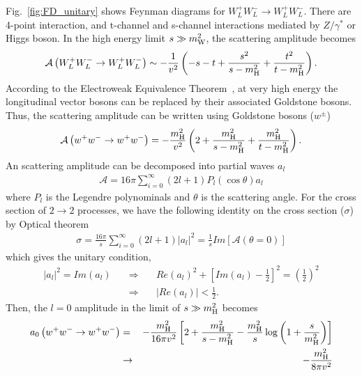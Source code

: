 Fig.~\ref{fig:FD_unitary} shows Feynman diagrams for $W_L^+W_L^- \to W_L^+W_L^-$. 
There are 4-point interaction, and t-channel and s-channel interactions mediated 
by $Z/\gamma^*$ or Higgs boson.
In the high energy limit $s \gg m_{\mathrm{W}}^2$, the scattering amplitude becomes \cite{Djouadi20081} 
\begin{eqnarray} 
\label{eq:WWscat}
\mathcal{A}\left( W_L^+W_L^- \to W_L^+W_L^- \right) 
\sim 
- \frac{1}{v^2}  \left( -s - t + \frac{s^2}{s - m_{\mathrm{H}}^2} + \frac{t^2}{t - m_{\mathrm{H}}^2} \right). 
\end{eqnarray} 
According to the Electroweak Equivalence Theorem~\cite{He:1994br},  
at very high energy the longitudinal vector bosons can be replaced by 
their associated Goldstone bosons. Thus, the scattering amplitude can be written 
using Goldstone bosons ($w^\pm$)
\begin{eqnarray} 
\mathcal{A}\left( w^+w^- \to w^+w^- \right) 
= 
- \frac{m_{\mathrm{H}}^2}{v^2}  \left( 2 + \frac{m_{\mathrm{H}}^2}{s - m_{\mathrm{H}}^2} + \frac{m_{\mathrm{H}}^2}{t - m_{\mathrm{H}}^2} \right). 
\end{eqnarray} 
An scattering amplitude can be decomposed into partial waves $a_l$
\begin{eqnarray} 
\mathcal{A} = 16 \pi \sum_{i=0}^\infty 
              \left( 2l+1 \right) P_l \left( \cos \theta \right) a_l
\end{eqnarray} 
where $P_l$ is the Legendre polynominals and $\theta$ is the scattering angle.
For the cross section of $2 \to 2$ processes, we have the 
following identity on the cross section ($\sigma$) by Optical theorem \cite{optical}
\begin{eqnarray} 
\sigma 
= \frac{16 \pi}{s} \sum_{i=0}^\infty  \left( 2l+1 \right) \left| a_l \right|^2 
= \frac{1}{s} Im \left[ \mathcal{A} \left(\theta = 0 \right)  \right]
\end{eqnarray} 
which gives the unitary condition, 
\begin{eqnarray} 
\left| a_l \right|^2 = Im \left( a_l \right) 
\quad &\Rightarrow& \quad  
Re\left( a_l \right)^2 
+ \left[ Im\left( a_l \right)  - \frac{1}{2} \right]^2 
= \left( \frac{1}{2} \right)^2 \\
\label{eq:unitaryWW}
\quad &\Rightarrow& \quad 
\left| Re \left( a_l \right) \right| < \frac{1}{2}.   
\end{eqnarray} 
Then, the $l=0$ amplitude in the limit of $ s \gg m_{\mathrm{H}}^2$ becomes  
\begin{eqnarray} 
a_0\left( w^+w^- \to w^+w^- \right)  
&=&  
- \frac{m_{\mathrm{H}}^2}{16\pi v^2}  
\left[ 2 + \frac{m_{\mathrm{H}}^2}{s - m_{\mathrm{H}}^2} 
       - \frac{m_{\mathrm{H}}^2}{s} \log \left( 1 + \frac{s}{m_{\mathrm{H}}^2} \right) \right]  \\
&\rightarrow&
- \frac{m_{\mathrm{H}}^2}{8\pi v^2} 
\end{eqnarray} 
